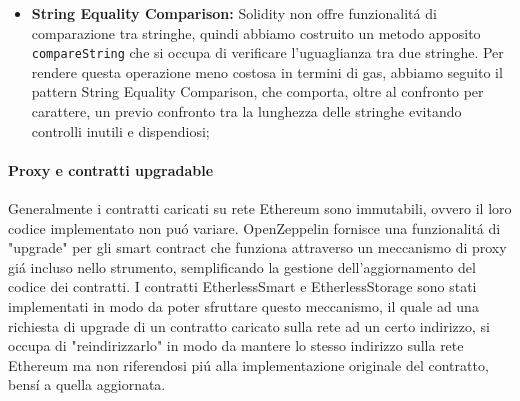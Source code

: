 \begin{itemize}
    \item \textbf{String Equality Comparison:} Solidity non offre funzionalitá di comparazione tra stringhe, quindi abbiamo costruito un metodo apposito \texttt{compareString} che si occupa di verificare l'uguaglianza tra due stringhe. Per rendere questa operazione meno costosa in termini di gas, abbiamo seguito il pattern String Equality Comparison, che comporta, oltre al confronto per carattere, un previo confronto tra la lunghezza delle stringhe evitando controlli inutili e dispendiosi;
  \end{itemize}

  \paragraph{Proxy e contratti upgradable}
    Generalmente i contratti caricati su rete Ethereum sono immutabili, ovvero il loro codice implementato non puó variare. OpenZeppelin fornisce una funzionalitá di "upgrade" per gli smart contract che funziona attraverso un meccanismo di proxy giá incluso nello strumento, semplificando la gestione dell'aggiornamento del codice dei contratti.
    I contratti EtherlessSmart e EtherlessStorage sono stati implementati in modo da poter sfruttare questo meccanismo, il quale ad una richiesta di upgrade di un contratto caricato sulla rete ad un certo indirizzo, si occupa di "reindirizzarlo" in modo da mantere lo stesso indirizzo sulla rete Ethereum ma non riferendosi piú alla implementazione originale del contratto, bensí a quella aggiornata.

